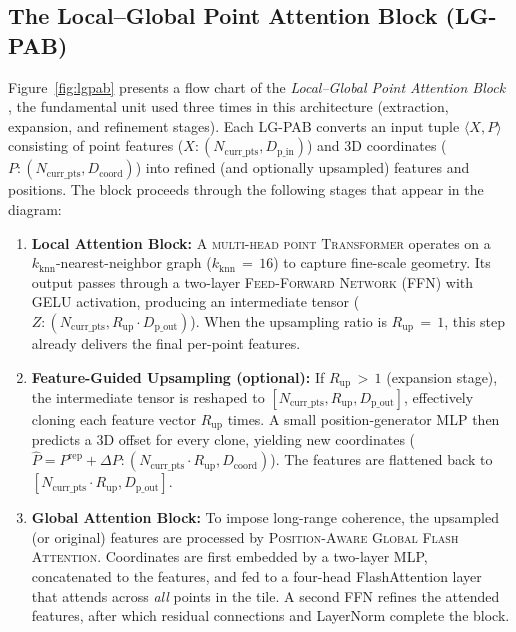 \documentclass[12pt]{report}
\begin{document}
\subsection{The Local–Global Point Attention Block (LG-PAB)}
\label{sec:lgpab}



Figure~\ref{fig:lgpab} presents a flow chart of the \emph{Local–Global Point Attention Block
}, the fundamental unit used three times in this architecture (extraction, expansion, and refinement stages). Each LG-PAB converts an input tuple $\langle X, P \rangle$ consisting of point features ($X: (N_{\text{curr\_pts}}, D_{\text{p\_in}})$) and 3D coordinates ($P: (N_{\text{curr\_pts}}, D_{\text{coord}})$) into refined (and optionally upsampled) features and positions. The block proceeds through the following stages that appear in the diagram:

\begin{enumerate}[leftmargin=*]
\item \textbf{Local Attention Block:}
      A
      \textsc{multi-head point Transformer} operates on a $k_{\text{knn}}$-nearest-neighbor graph ($k_{\text{knn}}\,{=}\,16$) to capture fine-scale geometry. Its output passes through a two-layer \textsc{Feed-Forward Network} (FFN) with GELU activation, producing an intermediate tensor
      ($Z: (N_{\text{curr\_pts}}, R_{\text{up}} \cdot D_{\text{p\_out}})$). When the upsampling ratio is $R_{\text{up}}\,{=}\,1$, this step already delivers the final per-point features.

\item[\emph{2\,a}] \textbf{Feature-Guided Upsampling (optional):
}
      If $R_{\text{up}}\,{>}\,1$ (expansion stage), the intermediate tensor is reshaped to $[N_{\text{curr\_pts}}, R_{\text{up}}, D_{\text{p\_out}}]$, effectively cloning each feature vector $R_{\text{up}}$ times.
      A small position-generator MLP then predicts a 3D offset for every clone, yielding new coordinates
      ($\hat{P} = P^{\text{rep}} + \Delta P: (N_{\text{curr\_pts}} \cdot R_{\text{up}}, D_{\text{coord}})$).
      The features are flattened back to $[N_{\text{curr\_pts}} \cdot R_{\text{up}}, D_{\text{p\_out}}]$.

\item \textbf{Global Attention Block:}
      To impose long-range coherence, the upsampled (or original) features are processed by
      \textsc{Position-Aware Global Flash Attention}. Coordinates are first embedded by a two-layer MLP, concatenated to the features, and fed to a four-head FlashAttention layer that attends across \emph{all} points in the tile. A second FFN refines the attended features, after which residual connections and LayerNorm complete the block.
\end{enumerate}
\end{document}
